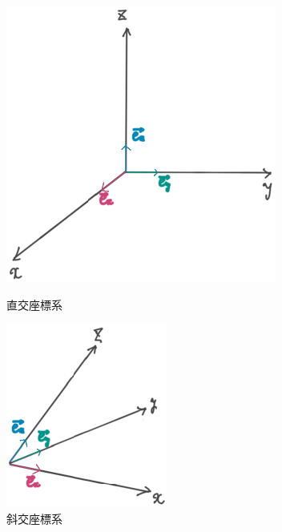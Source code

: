\documentclass[dvipdfmx,a4]{jsarticle}
\begin{document}
\begin{figure}[htbp]
  \centering
  \begin{minipage}{0.3\columnwidth}
    \centering
    \includegraphics[width=\columnwidth]{fig/cartecian.pdf}
    \caption{直交座標系}
    \label{car}
  \end{minipage}
  \begin{minipage}{0.25\columnwidth}
    \centering
    \includegraphics[width=\columnwidth]{fig/oblique.pdf}
    \caption{斜交座標系}
    \label{obl}
  \end{minipage}
\end{figure}
\end{document}
